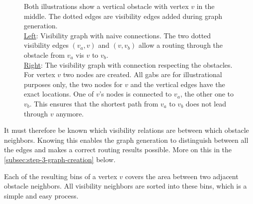 \begin{figure}[h]
\begin{figcenter}
					\end{figcenter}
					\caption{
						Both illustrations show a vertical obstacle with vertex $v$ in the middle.
						The dotted edges are visibility edges added during graph generation.
						\\
						\underline{Left}:
						Visibility graph with naive connections.
						The two dotted visibility edges $(v_a, v)$ and $(v, v_b)$ allow a routing through the obstacle from $v_a$ vis $v$ to $v_b$.
						\\
						\underline{Right}:
						The visibility graph with connection respecting the obstacles. For vertex $v$ two nodes are created.
						All gabs are for illustrational purposes only, the two nodes for $v$ and the vertical edges have the exact locations.
						One of $v$'s nodes is connected to $v_a$, the other one to $v_b$.
						This ensures that the shortest path from $v_a$ to $v_b$ does not lead through $v$ anymore.
					}
					\label{fig:routing-through-line-obstacle}
				\end{figure}
				
				It must therefore be known which visibility relations are between which obstacle neighbors.
				Knowing this enables the graph generation to distinguish between all the edges and makes a correct routing results possible.
				More on this in the \cref{subsec:step-3-graph-creation} below.
				
				Each of the resulting bins of a vertex $v$ covers the area between two adjacent obstacle neighbors.
				All visibility neighbors are sorted into these bins, which is a simple and easy process.
				
